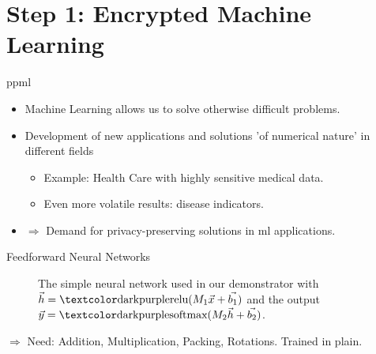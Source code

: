\section{Step 1: Encrypted Machine Learning}
\begin{frame}{\gls{ppml}}
  \begin{itemize}
    \item Machine Learning allows us to solve otherwise difficult problems.
    \item Development of new applications and solutions 'of numerical nature' in different fields
          \begin{itemize}
            \item Example: Health Care with highly sensitive medical data.
            \item Even more volatile results: disease indicators.
          \end{itemize}
    \item $\Rightarrow$ Demand for privacy-preserving solutions in \gls{ml} applications.
  \end{itemize}
\end{frame}

\begin{frame}{Feedforward Neural Networks}
  \begin{figure}[H]
    \centering
    \caption[Neural Network illustration resembling the one used in our demonstrator]{
      The simple neural network used in our demonstrator with $\vec{h} = \cryptop{relu}(M_1 \vec{x} + \vec{b_1})$ and the output $\vec{y} = \cryptop{softmax}(M_2 \vec{h} + \vec{b_2})$.
    }
    \label{fig:neural-network}
  \end{figure}
  \vspace{6pt}
  $\Rightarrow$ Need: Addition, Multiplication, Packing, Rotations. Trained in plain.
\end{frame}
